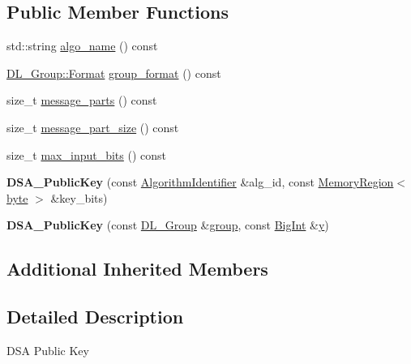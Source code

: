\subsection*{Public Member Functions}
\begin{DoxyCompactItemize}
\item 
std\-::string \hyperlink{classBotan_1_1DSA__PublicKey_aa70da899ea9e428d59aa00cbf1b3ef3c}{algo\-\_\-name} () const 
\item 
\hyperlink{classBotan_1_1DL__Group_ac602a30420ceec03fa181a10b09312a7}{D\-L\-\_\-\-Group\-::\-Format} \hyperlink{classBotan_1_1DSA__PublicKey_a2d488cc78bd0530840598a325493d0b5}{group\-\_\-format} () const 
\item 
size\-\_\-t \hyperlink{classBotan_1_1DSA__PublicKey_afe6e47a68287abf6ffe250d41bf4620c}{message\-\_\-parts} () const 
\item 
size\-\_\-t \hyperlink{classBotan_1_1DSA__PublicKey_af5547e0d43a5d800fb2e602445247255}{message\-\_\-part\-\_\-size} () const 
\item 
size\-\_\-t \hyperlink{classBotan_1_1DSA__PublicKey_ab113072907fb55ea3b69bd6b96b92e7c}{max\-\_\-input\-\_\-bits} () const 
\item 
\hypertarget{classBotan_1_1DSA__PublicKey_adfecbed4e1393bc2a6f6f58a4ac14be6}{{\bfseries D\-S\-A\-\_\-\-Public\-Key} (const \hyperlink{classBotan_1_1AlgorithmIdentifier}{Algorithm\-Identifier} \&alg\-\_\-id, const \hyperlink{classBotan_1_1MemoryRegion}{Memory\-Region}$<$ \hyperlink{namespaceBotan_a7d793989d801281df48c6b19616b8b84}{byte} $>$ \&key\-\_\-bits)}\label{classBotan_1_1DSA__PublicKey_adfecbed4e1393bc2a6f6f58a4ac14be6}

\item 
\hypertarget{classBotan_1_1DSA__PublicKey_ab01d100e802d87538d51a005739ebcaf}{{\bfseries D\-S\-A\-\_\-\-Public\-Key} (const \hyperlink{classBotan_1_1DL__Group}{D\-L\-\_\-\-Group} \&\hyperlink{classBotan_1_1DL__Scheme__PublicKey_a99e61704126f6c0fcdf5475027a46500}{group}, const \hyperlink{classBotan_1_1BigInt}{Big\-Int} \&\hyperlink{classBotan_1_1DL__Scheme__PublicKey_ab4e7d9e233e3c89de236699ea5774802}{y})}\label{classBotan_1_1DSA__PublicKey_ab01d100e802d87538d51a005739ebcaf}

\end{DoxyCompactItemize}
\subsection*{Additional Inherited Members}


\subsection{Detailed Description}
D\-S\-A Public Key 


